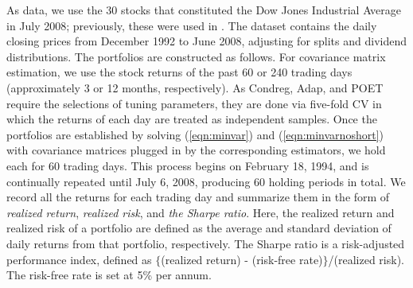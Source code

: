 \documentclass[times,sort&compress,3p]{elsarticle}
\begin{document}
As data, we use the 30 stocks that constituted the Dow Jones Industrial Average in July 2008;
previously, these were used in \citet{Won2013}. The dataset contains the daily closing prices from December 1992 to June
2008, adjusting for splits and dividend distributions. The portfolios are constructed as follows.
For covariance matrix estimation, we use the stock returns of the past 60 or 240 trading days (approximately
3 or 12 months, respectively).
As Condreg, Adap, and POET require the selections of tuning parameters, they are done via five-fold CV in which the
returns of each day are treated as independent samples.
Once the portfolios are established by solving (\ref{eqn:minvar}) and (\ref{eqn:minvarnoshort}) with covariance matrices
 plugged in by the corresponding estimators, we hold each for 60 trading days. This process begins on February 18,
 1994, and is continually repeated until July 6, 2008, producing 60 holding periods in total. We record all
 the returns for each trading day and summarize them in the form of \emph{realized return},
  \emph{realized risk}, and \emph{the Sharpe ratio}. Here, the realized return and realized risk of a portfolio are defined
 as the average and standard deviation of daily returns from that portfolio, respectively. The Sharpe ratio is a risk-adjusted
performance index, defined as $\{$(realized return) - (risk-free rate)$\}$/(realized risk). The risk-free rate is set  at 5\% per annum.
\end{document}
